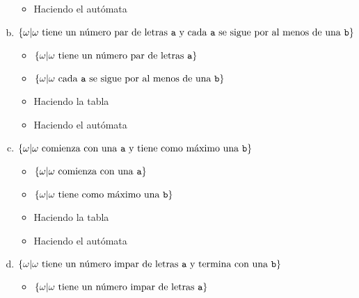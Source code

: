 \documentclass{article}
\begin{document}
\begin{enumerate}[a.]
\begin{itemize}
        \item Haciendo el autómata
        
    \end{itemize}    
    
    \item $\{\omega|\omega\text{ tiene un número par de letras \texttt{a} y cada \texttt{a} se sigue por al menos de una \texttt{b}}\}$
    
    \begin{itemize}
        \item $\{\omega|\omega\text{ tiene un número par de letras \texttt{a}}\}$
        
        
        \item $\{\omega|\omega\text{ cada \texttt{a} se sigue por al menos de una \texttt{b}}\}$
        
        
        \item Haciendo la tabla
        
        
        \item Haciendo el autómata
        
    \end{itemize}    
    
    \item $\{\omega|\omega \text{ comienza con una \texttt{a} y tiene como máximo una \texttt{b}}\}$
    \begin{itemize}
        \item $\{\omega|\omega\text{ comienza con una \texttt{a}}\}$
        
        
        \item $\{\omega|\omega\text{ tiene como máximo una \texttt{b}}\}$
        
        
        \item Haciendo la tabla
        
        
        \item Haciendo el autómata
        
    \end{itemize}    
    
    \item $\{\omega|\omega \text{ tiene un número impar de letras \texttt{a} y termina con una \texttt{b}}\}$
    \begin{itemize}
        \item $\{\omega|\omega\text{ tiene un número impar de letras \texttt{a}}\}$
        
        

\end{itemize}
\end{enumerate}
\end{document}

